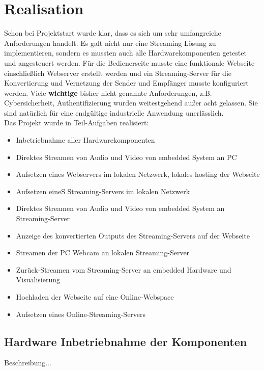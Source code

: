 \section{Realisation}
Schon bei Projektstart wurde klar, dass es sich um sehr umfangreiche Anforderungen handelt. Es galt nicht nur eine Streaming Lösung zu implementieren, sondern es mussten auch alle Hardwarekomponenten getestet und angesteuert werden. Für die Bedienerseite musste eine funktionale Webseite einschließlich Webserver erstellt werden und ein Streaming-Server für die Konvertierung und Vernetzung der Sender und Empfänger musste konfiguriert werden. Viele \textbf{wichtige} bisher nicht genannte Anforderungen, z.B. Cybersicherheit, Authentifizierung wurden weitestgehend außer acht gelassen. Sie sind natürlich für eine endgültige industrielle Anwendung unerlässlich.\\

Das Projekt wurde in Teil-Aufgaben realisiert:
\begin{itemize}
\item Inbetriebnahme aller Hardwarekomponenten

\item Direktes Streamen von Audio und Video von embedded System an PC
\item Aufsetzen eines Webservers im lokalen Netzwerk, lokales hosting der Webseite
\item Aufsetzen eineS Streaming-Servers im lokalen Netzwerk
\item Direktes Streamen von Audio und Video von embedded System an Streaming-Server
\item Anzeige des konvertierten Outputs des Streaming-Servers auf der Webseite

\item Streamen der PC Webcam an lokalen Streaming-Server
\item Zurück-Streamen vom Streaming-Server an embedded Hardware und Visualisierung

\item Hochladen der Webseite auf eine Online-Webspace
\item Aufsetzen eines Online-Streaming-Servers
\end{itemize}

\subsection{Hardware Inbetriebnahme der Komponenten}
Beschreibung...\\

